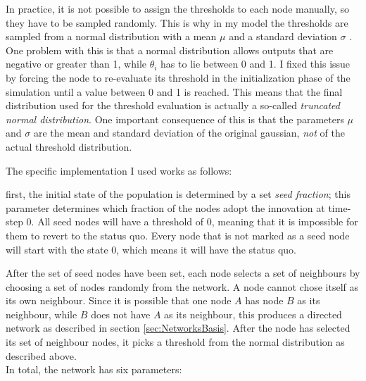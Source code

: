 \documentclass[11pt]{article}
\begin{document}
	In practice, it is not possible to assign the thresholds to each node manually, so they have to be sampled randomly. This is why in my model the thresholds are sampled from a normal distribution with a mean $\mu$ and a standard deviation $\sigma$ . One problem with this is that a normal distribution allows outputs that are negative or greater than 1, while $\theta_i$ has to lie between 0 and 1. I fixed this issue by forcing the node to re-evaluate its threshold in the initialization phase of the simulation until a value between 0 and 1 is reached. This means that the final distribution used for the threshold evaluation is actually a so-called \textit{truncated normal distribution}. One important consequence of this is that the parameters $\mu$ and $\sigma$ are the mean and standard deviation of the original gaussian, \textit{not} of the actual threshold distribution.
	
	The specific implementation I used works as follows:
	
	first, the initial state of the population is determined by a set \textit{seed fraction}; this parameter determines which fraction of the nodes adopt the innovation at time-step 0. All seed nodes will have a threshold of 0, meaning that it is impossible for them to revert to the status quo. Every node that is not marked as a seed node will start with the state 0, which means it will have the status quo.
	
	After the set of seed nodes have been set, each node selects a set of neighbours by choosing a set of nodes randomly from the network. A node cannot chose itself as its own neighbour. Since it is possible that one node $A$ has node $B$ as its neighbour, while $B$ does not have $A$ as its neighbour, this produces a directed network as described in section \ref{sec:NetworksBasis}. After the node has selected its set of neighbour nodes, it picks a threshold from the normal distribution as described above.
	\\
	In total, the network has six parameters:
	
\end{document}
